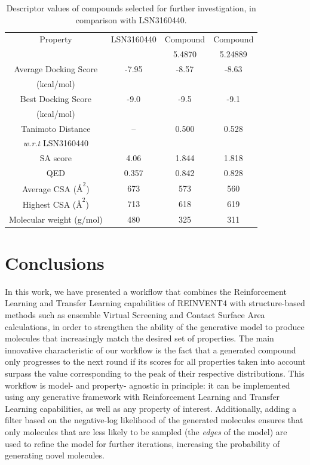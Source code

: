 \begin{table}[H]
  \caption{Descriptor values of compounds selected for further investigation, in comparison with LSN3160440.}
  \label{tab:new_molecules}
  \centering
  \begin{tabular}{cccc}
    \hline
    Property & LSN3160440 & Compound & Compound \\
             &     & 5.4870   & 5.24889 \\
    \hline
    Average Docking Score & -7.95 & -8.57 & -8.63\\
    (kcal/mol) & & & \\
    Best Docking Score & -9.0 & -9.5 & -9.1\\
    (kcal/mol) & & & \\
    Tanimoto Distance & -- & 0.500 & 0.528\\
    \textit{w.r.t} LSN3160440 & & & \\
    SA score & 4.06 & 1.844 & 1.818\\
    QED & 0.357 & 0.842 & 0.828\\
    Average CSA ($\text{\AA}^{2}$) & 673 & 573 & 560\\
    Highest CSA ($\text{\AA}^{2}$) & 713 & 618 & 619\\
    Molecular weight (g/mol) & 480 & 325 & 311\\
    \hline
  \end{tabular}
\end{table}

\section*{Conclusions}
In this work, we have presented a workflow that combines the Reinforcement Learning and Transfer Learning capabilities of REINVENT4 with structure-based methods such as ensemble Virtual Screening and Contact Surface Area calculations, in order to strengthen the ability of the generative model to produce molecules that increasingly match the desired set of properties. The main innovative characteristic of our workflow is the fact that a generated compound only progresses to the next round if its scores for all properties taken into account surpass the value corresponding to the peak of their respective distributions. This workflow is model- and property- agnostic in principle: it can be implemented using any generative framework with Reinforcement Learning and Transfer Learning capabilities, as well as any property of interest. Additionally, adding a filter based on the negative-log likelihood of the generated molecules ensures that only molecules that are less likely to be sampled (the \textit{edges} of the model) are used to refine the model for further iterations, increasing the probability of generating novel molecules.

